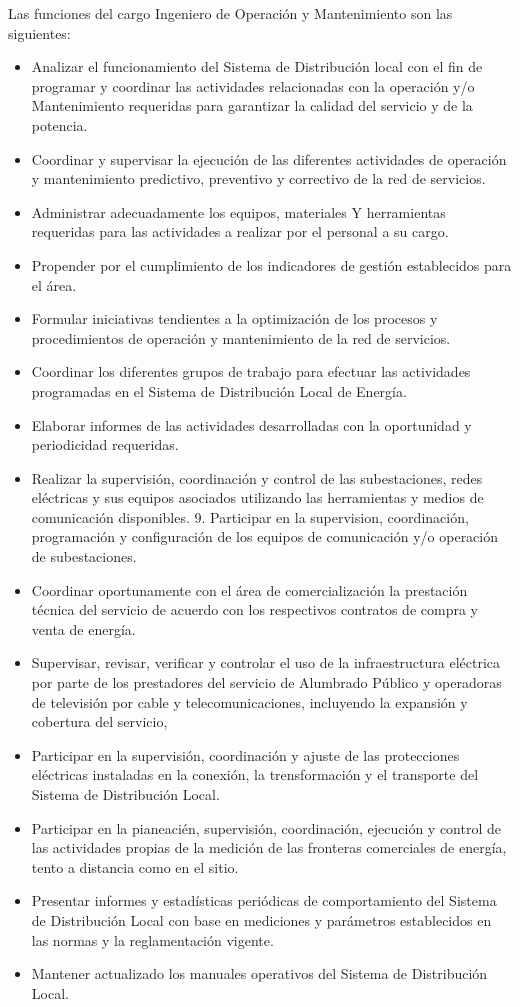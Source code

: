 \documentclass[a5paper]{book}%
\begin{document}
 Las funciones del cargo Ingeniero de Operación y Mantenimiento  son las siguientes:
 
 \begin{itemize}
 \item  Analizar el funcionamiento del Sistema de Distribución local con el fin de programar y coordinar  las actividades relacionadas con la operación y/o Mantenimiento requeridas para garantizar la calidad del servicio y de la potencia.
\item  Coordinar y supervisar la ejecución de las diferentes actividades de operación y mantenimiento predictivo,  preventivo y correctivo de la red de servicios.
\item  Administrar adecuadamente los equipos, materiales Y herramientas requeridas para las actividades a realizar por el personal a su cargo.
\item  Propender por el cumplimiento de los indicadores de gestión establecidos para el área.
\item  Formular iniciativas tendientes a la optimización de los procesos y procedimientos de operación y mantenimiento de la red de servicios.
\item  Coordinar los diferentes grupos de trabajo para efectuar las actividades programadas en  el Sistema de Distribución Local de Energía.
\item  Elaborar informes de las actividades desarrolladas con la oportunidad y periodicidad requeridas.
\item  Realizar la supervisión, coordinación y control de las subestaciones, redes eléctricas y sus equipos asociados utilizando las herramientas y
medios de comunicación disponibles. 9. Participar en la supervision, coordinación, programación y configuración de los equipos de comunicación y/o operación de subestaciones.
\item  Coordinar oportunamente con el área de comercialización la prestación técnica del servicio de acuerdo con los respectivos contratos de compra
y venta de energía.
\item  Supervisar, revisar, verificar y controlar el uso de la infraestructura eléctrica por parte de los prestadores del servicio de Alumbrado Público y
operadoras de televisión por cable y telecomunicaciones, incluyendo la expansión y cobertura del servicio,
\item  Participar en la supervisión, coordinación y ajuste de las protecciones eléctricas instaladas en la conexión, la trensformación y el transporte del
Sistema de Distribución Local.
\item  Participar en la pianeacién, supervisión, coordinación, ejecución y control de las actividades propias de la medición de las fronteras comerciales de energía, tento a distancia como en el sitio.
\item  Presentar informes y estadísticas  periódicas de comportamiento del Sistema de Distribución Local con base en mediciones y parámetros establecidos en las normas y la reglamentación vigente.
\item  Mantener actualizado los manuales operativos del Sistema de Distribución Local.
\end{itemize}
\end{document}
